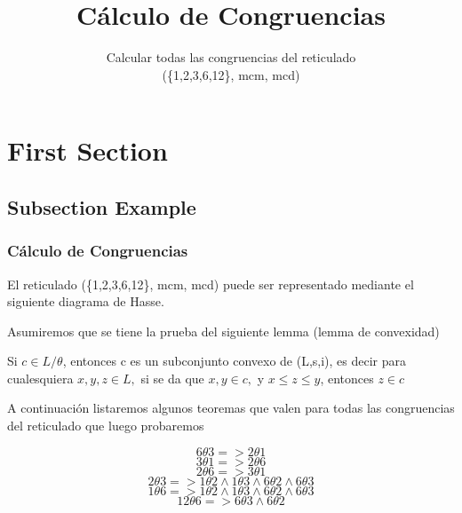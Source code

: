 \documentclass{beamer}
\title[Short title]{C\'alculo de Congruencias} %
\author{Calcular todas las congruencias del reticulado\\ (\{1,2,3,6,12\}, mcm, mcd)}
\begin{document}
\begin{frame}
\titlepage %
\end{frame}



\section{First Section}

\subsection{Subsection Example}

\begin{frame}
\frametitle{C\'alculo de Congruencias}
El reticulado (\{1,2,3,6,12\}, mcm, mcd) puede ser representado mediante el siguiente diagrama de Hasse.\\

\begin{center}
\end{center}
\end{frame}

\begin{frame}

Asumiremos que se tiene la prueba del siguiente lemma (lemma de convexidad)
\begin{lemma}
Si $c \in L/ \theta $, entonces c es un subconjunto convexo de (L,s,i), es decir
    para cualesquiera $x,y,z \in L,$ si se da que $x,y \in c, $ y $x \leq z \leq y$, entonces $ z \in c $
\end{lemma}

\end{frame}

\begin{frame}
A continuaci\'on listaremos algunos teoremas que valen para todas las congruencias del reticulado que luego probaremos
\begin{theorem}

\[  6 \theta 3 =>  2 \theta 1 \]
\[  3 \theta 1 =>  2 \theta 6 \]
\[  2 \theta 6 =>  3 \theta 1 \]
\[  2 \theta 3 =>  1 \theta 2 \land 1\theta3 \land 6\theta2 \land 6\theta3 \]
\[  1 \theta 6 =>  1 \theta 2 \land 1\theta3 \land 6\theta2 \land 6\theta3 \]
\[  12 \theta 6 =>  6 \theta 3 \land  6\theta2 \]

\end{theorem}
\end{frame}
\end{document}
